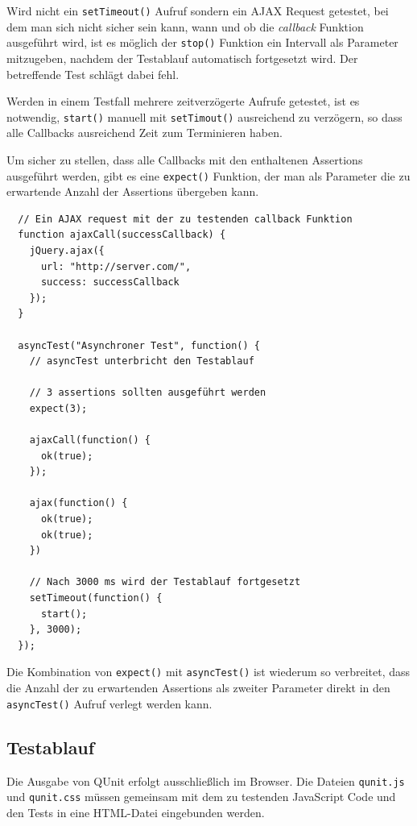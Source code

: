 \documentclass[11pt, a4paper]{article}
\begin{document}
Wird nicht ein \texttt{setTimeout()} Aufruf sondern ein AJAX Request
getestet, bei dem man sich nicht sicher sein kann, wann und ob die
\emph{callback} Funktion ausgeführt wird, ist es möglich der \texttt{stop()}
Funktion ein Intervall als Parameter mitzugeben, nachdem der Testablauf
automatisch fortgesetzt wird. Der betreffende Test schlägt dabei fehl.

Werden in einem Testfall mehrere zeitverzögerte Aufrufe getestet, ist es
notwendig, \texttt{start()} manuell mit \texttt{setTimout()} ausreichend zu
verzögern, so dass alle Callbacks ausreichend Zeit zum Terminieren haben.

Um sicher zu stellen, dass alle Callbacks mit den enthaltenen
Assertions ausgeführt werden, gibt es eine \texttt{expect()} Funktion,
der man als Parameter die zu erwartende Anzahl der Assertions übergeben
kann.

\begin{verbatim}
  // Ein AJAX request mit der zu testenden callback Funktion
  function ajaxCall(successCallback) {
    jQuery.ajax({
      url: "http://server.com/",
      success: successCallback
    });
  }

  asyncTest("Asynchroner Test", function() {
    // asyncTest unterbricht den Testablauf

    // 3 assertions sollten ausgeführt werden
    expect(3);

    ajaxCall(function() {
      ok(true);
    });

    ajax(function() {
      ok(true);
      ok(true);
    })

    // Nach 3000 ms wird der Testablauf fortgesetzt
    setTimeout(function() {
      start();
    }, 3000);
  });
\end{verbatim}

Die Kombination von \texttt{expect()} mit \texttt{asyncTest()} ist wiederum so
verbreitet, dass die Anzahl der zu erwartenden Assertions als zweiter
Parameter direkt in den \texttt{asyncTest()} Aufruf verlegt werden kann.

\clearpage

\subsection{Testablauf}

Die Ausgabe von QUnit erfolgt ausschließlich im Browser. Die Da\-tei\-en
\texttt{qunit.js} und \texttt{qunit.css} müssen gemeinsam mit dem zu testenden
JavaScript Code und den Tests in eine HTML-Datei eingebunden werden.
\end{document}
